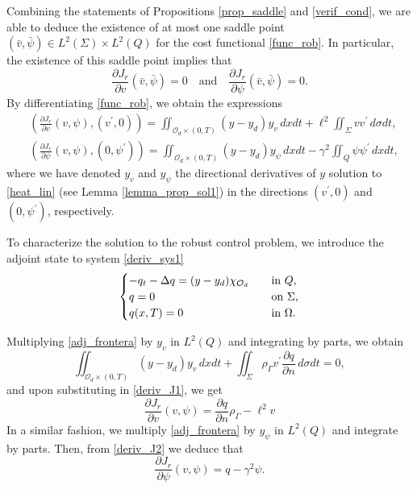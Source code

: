 \documentclass{aims}
\theoremstyle{definition}
\def\csbd{\rho_{\Gamma}}
\begin{document}
Combining the statements of Propositions \ref{prop_saddle} and \ref{verif_cond}, we are able to deduce the existence of at most one saddle point $(\bar v,\bar \psi)\in L^2(\Sigma)\times L^2(Q)$ for the cost functional \eqref{func_rob}. In particular, the existence of this saddle point implies that 
%
\begin{equation*}
\frac{\partial J_r}{\partial v}(\bar v,\bar \psi)=0 \quad \text{and}\quad \frac{\partial J_r}{\partial \psi}(\bar v,\bar \psi)=0.
\end{equation*}
%
By differentiating \eqref{func_rob}, we obtain the expressions 
%
\begin{align}\label{deriv_J1}
&\left(\frac{\partial J_r}{\partial v}(v,\psi),(v^\prime,0)\right)=\iint_{\mathcal O_d\times(0,T)}(y-y_d)y_v\,dxdt+\ell^2\iint_{\Sigma}vv^\prime\,d\sigma dt, \\ \label{deriv_J2}
&\left(\frac{\partial J_r}{\partial \psi}(v,\psi),(0,\psi^\prime)\right)=\iint_{\mathcal O_d\times(0,T)}(y-y_d)y_\psi\,dxdt-\gamma^2\iint_{Q}\psi\psi^\prime\,dxdt,
\end{align}
%
where we have denoted $y_v$ and $y_\psi$ the directional derivatives of $y$ solution to \eqref{heat_lin} (see Lemma \ref{lemma_prop_sol1}) in the directions $(v^\prime,0)$ and $(0,\psi^\prime)$, respectively. 

To characterize the solution to the robust control problem, we introduce the adjoint state to system \eqref{deriv_sys1}
%
\begin{equation}\label{adj_frontera}
\begin{cases}
-q_t-\Delta q=(y-y_d)\chi_{\mathcal O_d} \quad& \text{in }Q, \\
q=0 \quad &\textnormal{on $\Sigma$,} \\
q(x,T)=0 \quad &\textnormal{in $\Omega$}.
\end{cases}
\end{equation}

Multiplying \eqref{adj_frontera} by $y_v$ in $L^2(Q)$ and integrating by parts, we obtain  
%
\begin{equation*}
\iint_{\mathcal O_d\times(0,T)}(y-y_d)y_v\,dxdt+\iint_{\Sigma}\csbd v^\prime\frac{\partial q}{\partial n}\,d\sigma dt=0,
\end{equation*}
%
and upon substituting in \eqref{deriv_J1}, we get 
%
\begin{equation*}
\frac{\partial J_r}{\partial v}(v,\psi)=\frac{\partial q}{\partial n}\csbd-\ell^2v  
\end{equation*}
%
In a similar fashion, we multiply \eqref{adj_frontera} by $y_\psi$ in $L^2(Q)$ and integrate by parts. Then, from \eqref{deriv_J2} we deduce that 
%
\begin{equation*}
\frac{\partial J_r}{\partial \psi}(v,\psi)=q-\gamma^2\psi. 
\end{equation*}
\end{document}
